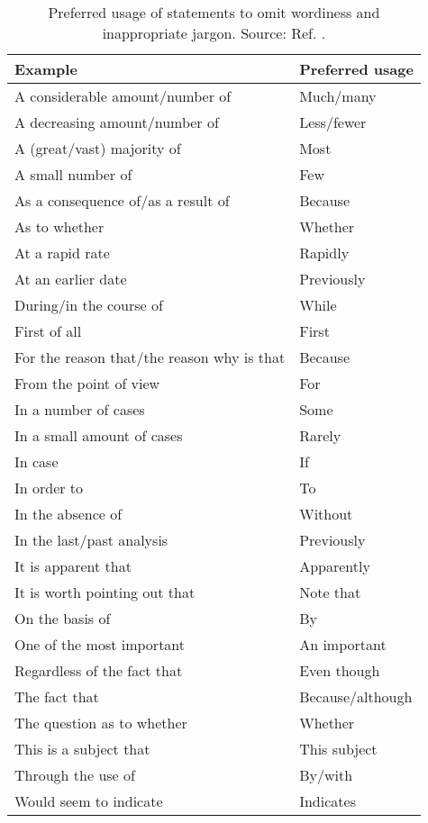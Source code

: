 \documentclass{article}
\begin{document}
\begin{table}[H]
\centering
\caption{Preferred usage of statements to omit wordiness and inappropriate jargon. Source: Ref. \cite{Weiss}. }
\begin{tabular}{l l}
\hline \textbf{Example} & \textbf{Preferred usage} \\\hline
 A considerable amount/number of         & Much/many   \\  
 A decreasing amount/number of           & Less/fewer  \\
 A (great/vast) majority of              & Most \\
 A small number of                       & Few \\
 As a consequence of/as a result of      & Because  \\
 As to whether                           & Whether \\
 At a rapid rate                         & Rapidly \\
 At an earlier date                      & Previously \\
 During/in the course of                 & While \\
 First of all                            & First  \\
 For the reason that/the reason why is that & Because  \\
 From the point of view                  & For \\
 In a number of cases                    & Some \\
 In a small amount of cases              & Rarely \\
 In case                                 & If \\
 In order to                             & To \\
 In the absence of                       & Without \\
 In the last/past analysis               & Previously \\
 It is apparent that                     & Apparently \\
 It is worth pointing out that           & Note that \\
 On the basis of                         & By \\
 One of the most important               & An important \\
 Regardless of the fact that             & Even though \\
 The fact that                           & Because/although \\
 The question as to whether              & Whether  \\
 This is a subject that                  & This subject \\
 Through the use of                      & By/with \\
 Would seem to indicate                  & Indicates \\
\hline
\end{tabular}
\label{table:wordiness}
\end{table}
\end{document}
